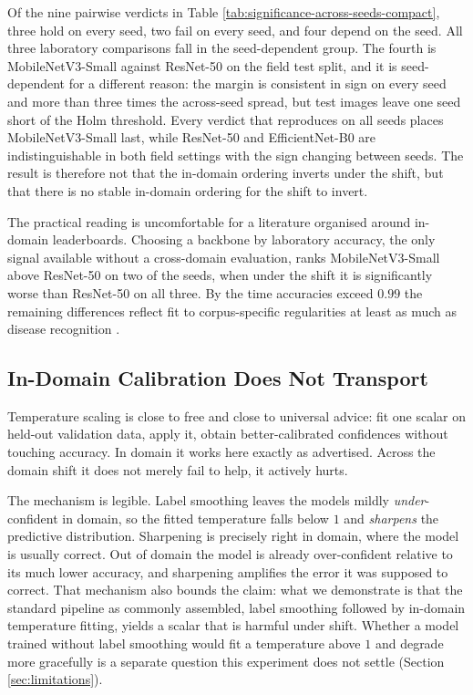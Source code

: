 \documentclass[runningheads]{llncs}
\begin{document}
Of the nine pairwise verdicts in Table
\ref{tab:significance-across-seeds-compact}, three hold on every seed, two fail
on every seed, and four depend on the seed. All three laboratory comparisons
fall in the seed-dependent group. The fourth is MobileNetV3-Small against
ResNet-50 on the field test split, and it is seed-dependent for a different
reason: the margin is consistent in sign on every seed and more than three times
the across-seed spread, but \NPdcTest{} test images leave one seed short of the
Holm threshold. Every verdict that reproduces on all seeds places
MobileNetV3-Small last, while ResNet-50 and EfficientNet-B0 are indistinguishable
in both field settings with the sign changing between seeds. The result is
therefore not that the in-domain ordering inverts under the shift, but that
there is no stable in-domain ordering for the shift to invert.

The practical reading is uncomfortable for a literature organised around
in-domain leaderboards. Choosing a backbone by laboratory accuracy, the only
signal available without a cross-domain evaluation, ranks MobileNetV3-Small above
ResNet-50 on two of the \NSeedsDone{} seeds, when under the shift it is
significantly worse than ResNet-50 on all three. By the time accuracies exceed
$0.99$ the remaining differences reflect fit to corpus-specific regularities at
least as much as disease recognition
\cite{torralba2011bias,geirhos2020shortcut}.

\subsection{In-Domain Calibration Does Not Transport}

Temperature scaling \cite{guo2017calibration} is close to free and close to
universal advice: fit one scalar on held-out validation data, apply it, obtain
better-calibrated confidences without touching accuracy. In domain it works here
exactly as advertised. Across the domain shift it does not merely fail to help,
it actively hurts.

The mechanism is legible. Label smoothing leaves the models mildly
\emph{under}-confident in domain, so the fitted temperature falls below $1$ and
\emph{sharpens} the predictive distribution. Sharpening is precisely right in
domain, where the model is usually correct. Out of domain the model is already
over-confident relative to its much lower accuracy, and sharpening amplifies the
error it was supposed to correct. That mechanism also bounds the claim: what we
demonstrate is that the standard pipeline as commonly assembled, label smoothing
followed by in-domain temperature fitting, yields a scalar that is harmful under
shift. Whether a model trained without label smoothing would fit a temperature
above $1$ and degrade more gracefully is a separate question this experiment
does not settle (Section \ref{sec:limitations}).
\end{document}
